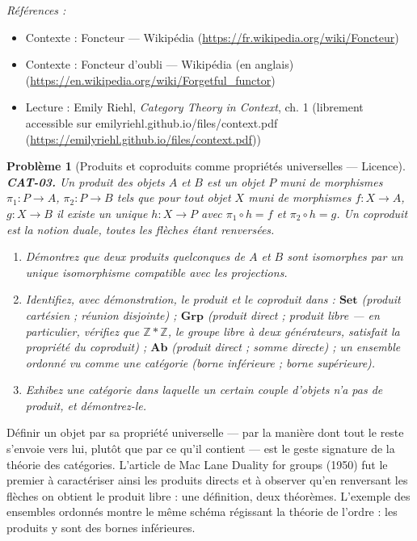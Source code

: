 \documentclass[11pt]{article}
\newtheorem{problem}{Problème}
\newenvironment{refs}{\par\small\noindent\emph{Références :}\begin{itemize}\setlength\itemsep{0pt}}{\end{itemize}\normalsize}
\begin{document}
\begin{refs}
\item Contexte : Foncteur --- Wikipédia (\url{https://fr.wikipedia.org/wiki/Foncteur})
\item Contexte : Foncteur d'oubli --- Wikipédia (en anglais) (\url{https://en.wikipedia.org/wiki/Forgetful_functor})
\item Lecture : Emily Riehl, \textit{Category Theory in Context}, ch. 1 (librement accessible sur emilyriehl.github.io/files/context.pdf (\url{https://emilyriehl.github.io/files/context.pdf}))
\end{refs}

\bigskip

\begin{problem}[{Produits et coproduits comme propriétés universelles --- Licence}]
\textbf{CAT-03.} Un \textit{produit} des objets $ A $ et $ B $ est un
objet $ P $ muni de morphismes $ \pi_1\colon P \to A $, $ \pi_2\colon P \to B $ tels que
pour tout objet $ X $ muni de morphismes $ f\colon X \to A $, $ g\colon X \to B $ il existe
un unique $ h\colon X \to P $ avec $ \pi_1 \circ h = f $ et $ \pi_2 \circ h = g $. Un
\textit{coproduit} est la notion duale, toutes les flèches étant renversées.
\begin{enumerate}
\item[(a)] Démontrez que deux
produits quelconques de $ A $ et $ B $ sont isomorphes par un unique isomorphisme compatible
avec les projections.
\item[(b)] Identifiez, avec démonstration, le produit et le coproduit dans : $ \mathbf{Set} $
(produit cartésien ; réunion disjointe) ; $ \mathbf{Grp} $ (produit direct ; produit libre --- en
particulier, vérifiez que $ \mathbb{Z} * \mathbb{Z} $, le groupe libre à deux générateurs,
satisfait la propriété du coproduit) ; $ \mathbf{Ab} $ (produit direct ; somme directe) ; un
ensemble ordonné vu comme une catégorie (borne inférieure ; borne supérieure).
\item[(c)] Exhibez une catégorie dans laquelle un certain couple d'objets n'a
pas de produit, et démontrez-le.
\end{enumerate}

\end{problem}

\noindent Définir un objet par sa propriété universelle --- par la manière dont tout le
reste s'envoie vers lui, plutôt que par ce qu'il contient --- est le geste signature de la théorie
des catégories. L'article de Mac Lane \og{} Duality for groups \fg{} (1950) fut le premier à caractériser
ainsi les produits directs et à observer qu'en renversant les flèches on obtient le produit libre :
une définition, deux théorèmes. L'exemple des ensembles ordonnés montre le même schéma régissant
la théorie de l'ordre : les produits y sont des bornes inférieures.
\end{document}
